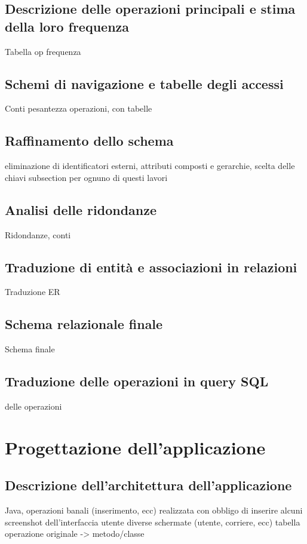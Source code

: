 \documentclass[a4paper,12pt]{report}
\begin{document}
\section{Descrizione delle operazioni principali e stima della loro frequenza}
Tabella op frequenza
\section{Schemi di navigazione e tabelle degli accessi}
Conti pesantezza operazioni, con tabelle
\section{Raffinamento dello schema}
eliminazione di identificatori esterni, attributi composti e gerarchie, scelta delle chiavi
subsection per ognuno di questi lavori
\section{Analisi delle ridondanze}
Ridondanze, conti
\section{Traduzione di entità e associazioni in relazioni}
Traduzione ER
\section{Schema relazionale finale}
Schema finale
\section{Traduzione delle operazioni in query SQL}
delle operazioni

\chapter{Progettazione dell'applicazione}
\section{Descrizione dell'architettura dell'applicazione}
Java, operazioni banali (inserimento, ecc)
realizzata con obbligo di inserire alcuni screenshot dell'interfaccia utente
diverse schermate (utente, corriere, ecc)
tabella operazione originale -> metodo/classe
\end{document}
